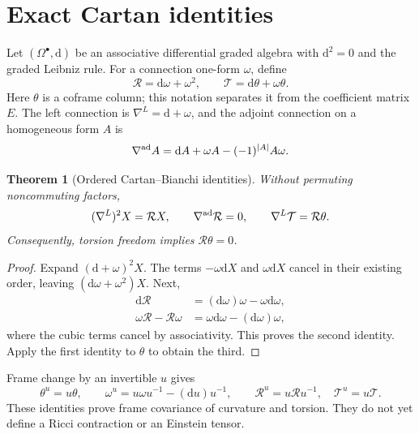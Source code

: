 \documentclass[11pt,a4paper,oneside]{book}
\theoremstyle{plain}
\newtheorem{theorem}{Theorem}[chapter]
\theoremstyle{definition}
\theoremstyle{remark}
\newcommand{\dd}{\mathrm d}
\begin{document}
\section{Exact Cartan identities}
Let $(\Omega^\bullet,\dd)$ be an associative differential graded algebra with $\dd^2=0$ and the graded Leibniz rule. For a connection one-form $\omega$, define
\begin{equation}
 \mathcal R=\dd\omega+\omega^2,\qquad
 \mathcal T=\dd\theta+\omega\theta.
 \label{eq:ordered-curv}
\end{equation}
Here $\theta$ is a coframe column; this notation separates it from the coefficient matrix $E$. The left connection is $\nabla^L=\dd+\omega$, and the adjoint connection on a homogeneous form $A$ is
\begin{equation}
 \nabla^{\rm ad}A=\dd A+\omega A-(-1)^{|A|}A\omega.
\end{equation}

\begin{theorem}[Ordered Cartan--Bianchi identities]
\label{thm:cartan}
Without permuting noncommuting factors,
\begin{equation}
 (\nabla^L)^2X=\mathcal RX,\qquad
 \nabla^{\rm ad}\mathcal R=0,\qquad
 \nabla^L\mathcal T=\mathcal R\theta.
 \label{eq:cartan-bianchi}
\end{equation}
Consequently, torsion freedom implies $\mathcal R\theta=0$.
\end{theorem}
\begin{proof}
Expand $(\dd+\omega)^2X$. The terms $-\omega\dd X$ and $\omega\dd X$ cancel in their existing order, leaving $(\dd\omega+\omega^2)X$. Next,
\begin{align*}
 \dd\mathcal R&=(\dd\omega)\omega-\omega\dd\omega,\\
 \omega\mathcal R-\mathcal R\omega
 &=\omega\dd\omega-(\dd\omega)\omega,
\end{align*}
where the cubic terms cancel by associativity. This proves the second identity. Apply the first identity to $\theta$ to obtain the third.
\end{proof}
\cite{R13}
Frame change by an invertible $u$ gives
\begin{equation}
 \theta^u=u\theta,\qquad
 \omega^u=u\omega u^{-1}-(\dd u)u^{-1},\qquad
 \mathcal R^u=u\mathcal Ru^{-1},\quad \mathcal T^u=u\mathcal T.
\end{equation}
These identities prove frame covariance of curvature and torsion. They do not yet define a Ricci contraction or an Einstein tensor.
\end{document}
